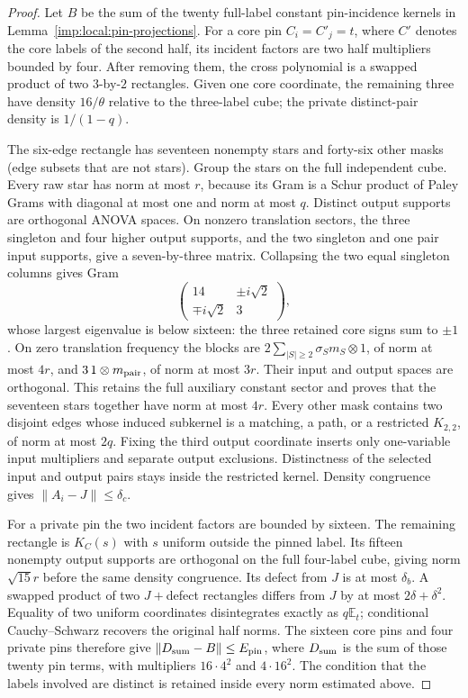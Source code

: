 \begin{proof}
Let $B$ be the sum of the twenty full-label constant pin-incidence
kernels in Lemma~\ref{imp:local:pin-projections}. For a core pin
$C_i=C'_j=t$, where $C'$ denotes the core labels of the second half, its incident factors are two half multipliers bounded
by four. After removing them, the cross polynomial is a swapped
product of two $3$-by-$2$ rectangles. Given one core coordinate,
the remaining three have density $16/\theta$ relative to the
three-label cube; the private distinct-pair density is $1/(1-q)$.

The six-edge rectangle has seventeen nonempty stars and
forty-six other masks (edge subsets that are not stars). Group the stars on the full independent cube.
Every raw star has norm at most $r$, because its Gram is a Schur
product of Paley Grams with diagonal at most one and norm at most
$q$. Distinct output supports are orthogonal ANOVA spaces.
On nonzero translation sectors, the three singleton and four
higher output supports, and the two singleton and one pair input
supports, give a seven-by-three matrix. Collapsing the two equal
singleton columns gives Gram
\[
 \begin{pmatrix}14&\pm i\sqrt2\\\mp i\sqrt2&3\end{pmatrix},
\]
whose largest eigenvalue is below sixteen: the three retained
core signs sum to $\pm1$. On zero translation frequency the
blocks are $2\sum_{|S|\ge2}\sigma_Sm_S\otimes1$, of norm at most
$4r$, and $3\,1\otimes m_{\rm pair}$, of norm at most $3r$.
Their input and output spaces are orthogonal. This retains the
full auxiliary constant sector and proves that the seventeen stars together have norm at most $4r$.
Every other mask contains two disjoint edges whose induced
subkernel is a matching, a path, or a restricted $K_{2,2}$, of
norm at most $2q$.
Fixing the third output coordinate inserts only one-variable input
multipliers and separate output exclusions. Distinctness of the
selected input and output pairs stays inside the restricted
kernel. Density congruence gives $\|A_i-J\|\le\delta_c$.

For a private pin the two incident factors are bounded by sixteen.
The remaining rectangle is $K_C(s)$ with $s$ uniform outside the
pinned label. Its fifteen nonempty output supports are orthogonal
on the full four-label cube, giving norm $\sqrt{15}r$ before the
same density congruence. Its defect from $J$ is at most $\delta_b$.
A swapped product of two $J+$defect rectangles differs from $J$
by at most $2\delta+\delta^2$. Equality of two uniform coordinates
disintegrates exactly as $q\mathbb E_t$; conditional
Cauchy--Schwarz recovers the original half norms. The sixteen
core pins and four private pins therefore give
$\|D_{\rm sum}-B\|\le E_{\rm pin}$, where $D_{\rm sum}$ is the
sum of those twenty pin terms, with multipliers
$16\cdot4^2$ and $4\cdot16^2$. The condition that the labels involved are distinct is retained
inside every norm estimated above.


\end{proof}
